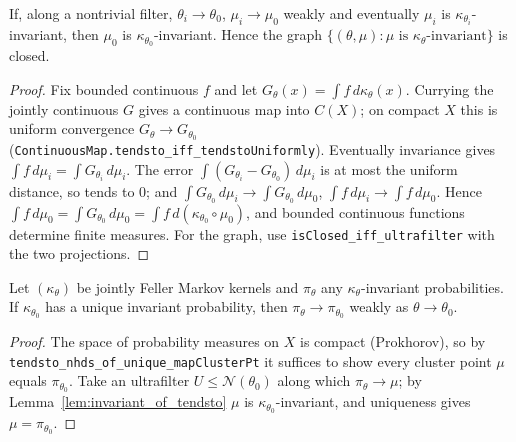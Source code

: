 \begin{lemma}
\label{lem:invariant_of_tendsto}
\leanok
{}
If, along a nontrivial filter, $\theta_i\to\theta_0$, $\mu_i\to\mu_0$ weakly and eventually $\mu_i$ is
$\kappa_{\theta_i}$-invariant, then $\mu_0$ is $\kappa_{\theta_0}$-invariant. Hence the graph
$\{(\theta,\mu) : \mu \text{ is } \kappa_\theta\text{-invariant}\}$ is closed.
\end{lemma}
\begin{proof}
\leanok
{}
Fix bounded continuous $f$ and let $G_\theta(x) = \int f\,d\kappa_\theta(x)$. Currying the jointly continuous $G$
gives a continuous map into $C(X)$; on compact $X$ this is uniform convergence $G_\theta\to G_{\theta_0}$
(\texttt{ContinuousMap.tendsto\_iff\_tendstoUniformly}). Eventually invariance gives
$\int f\,d\mu_i = \int G_{\theta_i}\,d\mu_i$. The error $\int (G_{\theta_i} - G_{\theta_0})\,d\mu_i$ is at most the
uniform distance, so tends to $0$; and $\int G_{\theta_0}\,d\mu_i \to \int G_{\theta_0}\,d\mu_0$,
$\int f\,d\mu_i\to\int f\,d\mu_0$. Hence $\int f\,d\mu_0 = \int G_{\theta_0}\,d\mu_0 = \int f\,d(\kappa_{\theta_0}\circ\mu_0)$,
and bounded continuous functions determine finite measures. For the graph, use
\texttt{isClosed\_iff\_ultrafilter} with the two projections.
\end{proof}

\begin{theorem}[SL Thm 12.13]
\label{thm:tendsto_invariant_of_unique}
\leanok
{}
Let $(\kappa_\theta)$ be jointly Feller Markov kernels and $\pi_\theta$ any $\kappa_\theta$-invariant probabilities.
If $\kappa_{\theta_0}$ has a unique invariant probability, then $\pi_\theta \to \pi_{\theta_0}$ weakly as
$\theta\to\theta_0$.
\end{theorem}
\begin{proof}
\leanok
{}
The space of probability measures on $X$ is compact (Prokhorov), so by
\texttt{tendsto\_nhds\_of\_unique\_mapClusterPt} it suffices to show every cluster point $\mu$ equals
$\pi_{\theta_0}$. Take an ultrafilter $U\le\mathcal N(\theta_0)$ along which $\pi_\theta\to\mu$; by
Lemma~\ref{lem:invariant_of_tendsto} $\mu$ is $\kappa_{\theta_0}$-invariant, and uniqueness gives $\mu=\pi_{\theta_0}$.
\end{proof}

